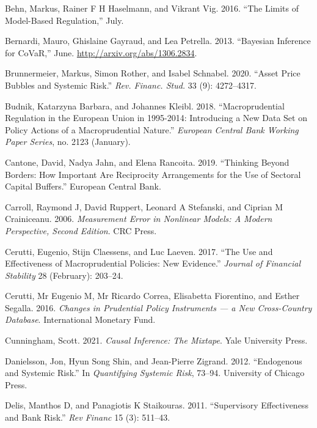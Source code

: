 \documentclass[
  10pt,
]{article}
\begin{document}
\leavevmode\hypertarget{ref-Behn2016}{}%
Behn, Markus, Rainer F H Haselmann, and Vikrant Vig. 2016. ``The Limits
of Model-Based Regulation,'' July.

\leavevmode\hypertarget{ref-Bernardi2013}{}%
Bernardi, Mauro, Ghislaine Gayraud, and Lea Petrella. 2013. ``Bayesian
Inference for CoVaR,'' June. \url{http://arxiv.org/abs/1306.2834}.

\leavevmode\hypertarget{ref-Brunnermeier2020}{}%
Brunnermeier, Markus, Simon Rother, and Isabel Schnabel. 2020. ``Asset
Price Bubbles and Systemic Risk.'' \emph{Rev. Financ. Stud.} 33 (9):
4272--4317.

\leavevmode\hypertarget{ref-Budnik2018}{}%
Budnik, Katarzyna Barbara, and Johannes Kleibl. 2018. ``Macroprudential
Regulation in the European Union in 1995-2014: Introducing a New Data
Set on Policy Actions of a Macroprudential Nature.'' \emph{European
Central Bank Working Paper Series}, no. 2123 (January).

\leavevmode\hypertarget{ref-Cantone2019}{}%
Cantone, David, Nadya Jahn, and Elena Rancoita. 2019. ``Thinking Beyond
Borders: How Important Are Reciprocity Arrangements for the Use of
Sectoral Capital Buffers.'' European Central Bank.

\leavevmode\hypertarget{ref-Carroll2006}{}%
Carroll, Raymond J, David Ruppert, Leonard A Stefanski, and Ciprian M
Crainiceanu. 2006. \emph{Measurement Error in Nonlinear Models: A Modern
Perspective, Second Edition}. CRC Press.

\leavevmode\hypertarget{ref-Cerutti2017}{}%
Cerutti, Eugenio, Stijn Claessens, and Luc Laeven. 2017. ``The Use and
Effectiveness of Macroprudential Policies: New Evidence.'' \emph{Journal
of Financial Stability} 28 (February): 203--24.

\leavevmode\hypertarget{ref-Cerutti2016}{}%
Cerutti, Mr Eugenio M, Mr Ricardo Correa, Elisabetta Fiorentino, and
Esther Segalla. 2016. \emph{Changes in Prudential Policy Instruments ---
a New Cross-Country Database}. International Monetary Fund.

\leavevmode\hypertarget{ref-Cunningham2021}{}%
Cunningham, Scott. 2021. \emph{Causal Inference: The Mixtape}. Yale
University Press.

\leavevmode\hypertarget{ref-Danielsson2012}{}%
Danielsson, Jon, Hyun Song Shin, and Jean-Pierre Zigrand. 2012.
``Endogenous and Systemic Risk.'' In \emph{Quantifying Systemic Risk},
73--94. University of Chicago Press.

\leavevmode\hypertarget{ref-Delis2011}{}%
Delis, Manthos D, and Panagiotis K Staikouras. 2011. ``Supervisory
Effectiveness and Bank Risk.'' \emph{Rev Financ} 15 (3): 511--43.
\end{document}
